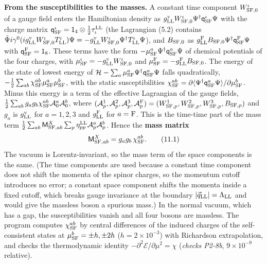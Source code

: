 \documentclass[
  10pt,
]{article}
\begin{document}
\textbf{From the susceptibilities to the masses.} A constant time
component \(W^\iota_{{\rm SF},0}\) of a gauge field enters the
Hamiltonian density as
\(g^{\rm v}_{\rm LL}W^\iota_{{\rm SF},0}\Psi^\dagger\mathsf q^\iota_{\rm SF}\Psi\)
with the charge matrix
\(\mathsf q^\iota_{\rm SF}=\mathsf 1_4\otimes\tfrac12\tau^{\rm LL}_\iota\)
(the Lagrangian (5.2) contains
\(\bar\Psi i\gamma^0(ig^{\rm v}_{\rm LL}W^\iota_{{\rm SF},0}T^\iota_{\rm LL})\Psi=-g^{\rm v}_{\rm LL}W^\iota_{{\rm SF},0}\Psi^\dagger T^\iota_{\rm LL}\Psi\)),
and \(B_{{\rm SF},0}\) as
\(g^{\rm F}_{\rm LL}B_{{\rm SF},0}\Psi^\dagger\mathsf q^{\rm F}_{\rm SF}\Psi\)
with \(\mathsf q^{\rm F}_{\rm SF}=\mathsf 1_8\). These terms have the
form \(-\mu^a_{\rm SF}\Psi^\dagger\mathsf q^a_{\rm SF}\Psi\) of chemical
potentials of the four charges, with
\(\mu^\iota_{\rm SF}=-g^{\rm v}_{\rm LL}W^\iota_{{\rm SF},0}\) and
\(\mu^{\rm F}_{\rm SF}=-g^{\rm F}_{\rm LL}B_{{\rm SF},0}\). The energy
of the state of lowest energy of
\(\mathcal H-\sum_a\mu^a_{\rm SF}\Psi^\dagger\mathsf q^a_{\rm SF}\Psi\)
falls quadratically,
\(-\tfrac12\sum_{ab}\chi^{ab}_{\rm SF}\mu^a_{\rm SF}\mu^b_{\rm SF}\),
with the static susceptibilities
\(\chi^{ab}_{\rm SF}=\partial\langle\Psi^\dagger\mathsf q^a_{\rm SF}\Psi\rangle/\partial\mu^b_{\rm SF}\).
Minus this energy is a term of the effective Lagrangian of the gauge
fields,
\(\tfrac12\sum_{ab}g_ag_b\chi^{ab}_{\rm SF}\mathcal A^a_0\mathcal A^b_0\),
where
\((\mathcal A^1_p,\mathcal A^2_p,\mathcal A^3_p,\mathcal A^{\rm F}_p)=(W^1_{{\rm SF},p},W^2_{{\rm SF},p},W^3_{{\rm SF},p},B_{{\rm SF},p})\)
and \(g_a\) is \(g^{\rm v}_{\rm LL}\) for \(a=1,2,3\) and
\(g^{\rm F}_{\rm LL}\) for \(a={\rm F}\). This is the time-time part of
the mass term
\(\tfrac12\sum_{ab}\mathsf M^X_{{\rm SF},ab}\sum_p\eta^{\rm LL}_{pp}\mathcal A^a_p\mathcal A^b_p\).
Hence the \textbf{mass matrix}
\[\mathsf M^X_{{\rm SF},ab}=g_ag_b\,\chi^{ab}_{\rm SF}.\tag{11.1}\] The
vacuum is Lorentz-invariant, so the mass term of the space components is
the same. (The time components are used because a constant time
component does not shift the momenta of the spinor charges, so the
momentum cutoff introduces no error; a constant space component shifts
the momenta inside a fixed cutoff, which breaks gauge invariance at the
boundary \(\lvert\vec q_{\rm LL}\rvert=\Lambda_{\rm LL}\) and would give
the massless boson a spurious mass.) In the normal vacuum, which has a
gap, the susceptibilities vanish and all four bosons are massless. The
program computes \(\chi^{ab}_{\rm SF}\) by central differences of the
induced charges of the self-consistent states at
\(\mu^b_{\rm SF}=\pm h,\pm2h\) (\(h=2\times10^{-3}\)) with Richardson
extrapolation, and checks the thermodynamic identity
\(-\partial^2\mathcal E/\partial\mu^2=\chi\) (\emph{checks P2-8b},
\(9\times10^{-9}\) relative).
\end{document}
